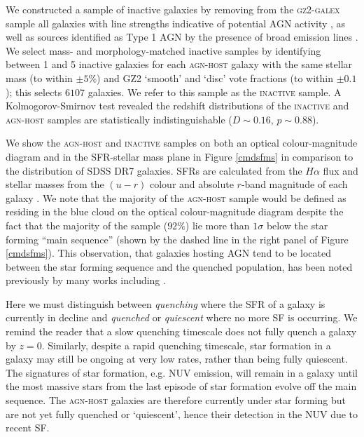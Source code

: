 \documentclass[useAMS,usenatbib]{mn2e}
\def\changed    {\color{nc} }
\def\newref    {\color{new} }
\begin{document}
We constructed a sample of inactive galaxies by removing from the \textsc{gz2-galex} sample {\changed all galaxies with line strengths indicative of potential AGN activity \citep*{Kauff03b}}, as well as sources identified as Type 1 AGN by the presence of broad emission lines \citep{Oh15}. {\changed We select mass- and morphology-matched inactive samples by identifying between 1 and 5 inactive galaxies for each \textsc{agn-host} galaxy with the same stellar mass (to within $\pm5\%$) and GZ2 `smooth' and `disc' vote fractions (to within $\pm 0.1$); this selects $6107$ galaxies.} We refer to this sample as the \textsc{inactive} sample. A Kolmogorov-Smirnov test revealed the redshift distributions of the \textsc{inactive} and \textsc{agn-host} samples are statistically indistinguishable ($D \sim 0.16$, $p \sim 0.88$). 


{\newref We show the \textsc{agn-host} and \textsc{inactive}  samples on both an optical colour-magnitude diagram and in the SFR-stellar mass plane in Figure \ref{cmdsfms} in comparison to the distribution of SDSS DR7 galaxies. SFRs are calculated from the $H\alpha$ flux \citep{Kennicutt94} and stellar masses from the $(u-r)$ colour and absolute $r$-band magnitude of each galaxy \citep{Baldry06}. We note that the majority of the \textsc{agn-host} sample would be defined as residing in the blue cloud on the optical colour-magnitude diagram despite the fact that the majority of the sample ($92\%$) lie more than $1\sigma$ below the star forming ``main sequence'' (shown by the dashed line in the right panel of Figure \ref{cmdsfms}). This observation, that galaxies hosting AGN tend to be located between the star forming sequence and the quenched population, has been noted previously by many works including \citealt{Sch10, ref, ref, ref}. }

{\newref Here we must distinguish between \emph{quenching} where the SFR of a galaxy is currently in decline and \emph{quenched} or \emph{quiescent} where no more SF is occurring. We remind the reader that a slow quenching timescale does not fully quench a galaxy by $z=0$. Similarly, despite a rapid quenching timescale, star formation in a galaxy may still be ongoing at very low rates, rather than being fully quiescent. The signatures of star formation, e.g. NUV emission, will remain in a galaxy until the most massive stars from the last episode of star formation evolve off the main sequence. The \textsc{agn-host} galaxies are therefore currently under star forming but are not yet fully quenched or `quiescent', hence their detection in the NUV due to recent SF.}
\end{document}
